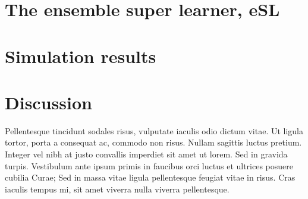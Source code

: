 \documentclass[11pt, a4paper]{article}
\theoremstyle{definition}
\theoremstyle{remark}
\begin{document}
\section{The ensemble super learner, eSL}
\section{Simulation results}
\section{Discussion}
Pellentesque tincidunt sodales risus, vulputate iaculis odio dictum vitae. Ut ligula tortor, porta a consequat ac, commodo non risus. Nullam sagittis luctus pretium. Integer vel nibh at justo convallis imperdiet sit amet ut lorem. Sed in gravida turpis. Vestibulum ante ipsum primis in faucibus orci luctus et ultrices posuere cubilia Curae; Sed in massa vitae ligula pellentesque feugiat vitae in risus. Cras iaculis tempus mi, sit amet viverra nulla viverra pellentesque.
\end{document}
